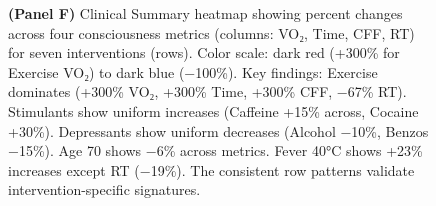 \begin{figure}[htbp]
{        \textbf{(Panel F)} Clinical Summary heatmap showing percent changes across four consciousness metrics (columns: VO₂, Time, CFF, RT) for seven interventions (rows). Color scale: dark red (+300\% for Exercise VO₂) to dark blue (−100\%). Key findings: Exercise dominates (+300\% VO₂, +300\% Time, +300\% CFF, −67\% RT). Stimulants show uniform increases (Caffeine +15\% across, Cocaine +30\%). Depressants show uniform decreases (Alcohol −10\%, Benzos −15\%). Age 70 shows −6\% across metrics. Fever 40°C shows +23\% increases except RT (−19\%). The consistent row patterns validate intervention-specific signatures.
    }
    \label{fig:clinical_validation}
\end{figure}
